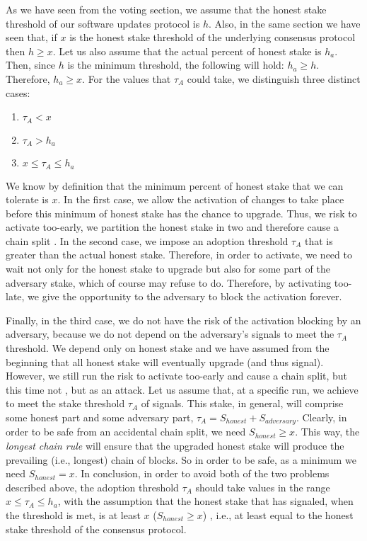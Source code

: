 As we have seen from the voting section, we assume that the honest stake threshold of our software updates protocol is $h$. Also, in the same section we have seen that, if $x$ is the honest stake threshold of the underlying consensus protocol then $h \geq x$. Let us also assume that the actual percent of honest stake is $h_a$. Then, since $h$ is the minimum threshold, the following will hold: $ h_a \geq h$. Therefore, $h_a \geq x$. For the values that $\tau_A$ could take, we distinguish three distinct cases:
\begin{enumerate}
\item $\tau_A < x$
\item $\tau_A > h_a$
\item $ x \leq \tau_A \leq h_a$
\end{enumerate}
We know by definition that the minimum percent of honest stake that we can tolerate is $x$. In the first case, we allow the activation of changes to take place before this minimum of honest stake has the chance to upgrade. Thus, we risk to activate too-early, we partition the honest stake in two and therefore cause a chain split . In the second case, we impose an adoption threshold $\tau_A$ that is greater than the actual honest stake. Therefore, in order to activate, we need to wait not only for the honest stake to upgrade but also for some part of the adversary stake, which of course may refuse to do. Therefore, by activating too-late, we give the opportunity to the adversary to block the activation forever.

Finally, in the third case, we do not have the risk of the activation blocking by an adversary, because we do not depend on the adversary's signals to meet the $\tau_A$ threshold. We depend only on honest stake and we have assumed from the beginning that all honest stake will eventually upgrade (and thus signal). However, we still run the risk to activate too-early and cause a chain split, but this time not , but as an attack. Let us assume that, at a specific run, we achieve to meet the stake threshold $\tau_A$ of signals. This stake, in general, will comprise some honest part and some adversary part, $\tau_A = S_{honest} + S_{adversary}$. Clearly, in order to be safe from an accidental chain split, we need $S_{honest} \geq x$. This way, the \emph{longest chain rule} will ensure that the upgraded honest stake will produce the prevailing (i.e., longest) chain of blocks. So in order to be safe, as a minimum we need $S_{honest} = x$. In conclusion, in order to avoid both of the two problems described above, the adoption threshold $\tau_A$ should take values in the range $x \leq \tau_A \leq h_a$, with the assumption that the honest stake that has signaled, when the threshold is met, is at least $x$ ($S_{honest} \geq x$) , i.e., at least equal to the honest stake threshold of the consensus protocol. 

